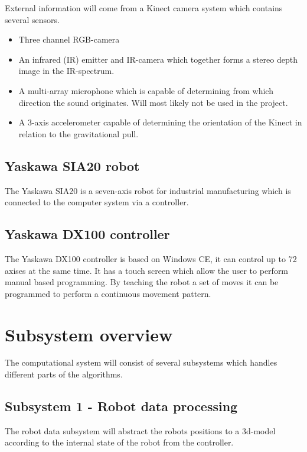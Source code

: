 \documentclass[10pt,a4paper,twocolumn,english]{article}
\begin{document}
External information will come from a Kinect camera system which contains several sensors.\cite{kinectref}

\begin{itemize}
\item Three channel RGB-camera
\item An infrared (IR) emitter and IR-camera which together forms a stereo depth image in the IR-spectrum.
\item A multi-array microphone which is capable of determining from which direction the sound originates. Will most likely not be used in the project.
\item A 3-axis accelerometer capable of determining the orientation of the Kinect in relation to the gravitational pull.
\end{itemize}

\subsection{Yaskawa SIA20 robot}

The Yaskawa SIA20 is a seven-axis robot for industrial manufacturing which is connected to the computer system via a controller.\cite{sia20}

\subsection{Yaskawa DX100 controller}

The Yaskawa DX100 controller is based on Windows CE, it can control up to 72 axises at the same time. It has a touch screen which allow the user to perform manual based programming. By teaching the robot a set of moves it can be programmed to perform a continuous movement pattern.

\section{Subsystem overview}

The computational system will consist of several subsystems which handles different parts of the algorithms.

\subsection{Subsystem 1 - Robot data processing}

The robot data subsystem will abstract the robots positions to a 3d-model according to the internal state of the robot from the controller.
\end{document}
